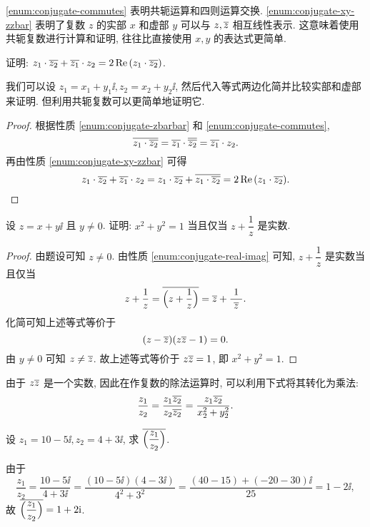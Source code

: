 \ref{enum:conjugate-commutes} 表明共轭运算和四则运算交换.
\ref{enum:conjugate-xy-zzbar} 表明了复数 $z$ 的实部 $x$ 和虚部 $y$ 可以与 $z,\overline z$ 相互线性表示.
这意味着使用共轭复数进行计算和证明, 往往比直接使用 $x,y$ 的表达式更简单.

\begin{example}
  证明: $z_1\cdot\overline{z_2}+\overline{z_1}\cdot z_2=2\operatorname{Re}{(z_1\cdot\overline{z_2})}$.
\end{example}

我们可以设 $z_1=x_1+y_1\ii,z_2=x_2+y_2\ii$, 然后代入等式两边化简并比较实部和虚部来证明.
但利用共轭复数可以更简单地证明它.

\begin{proof}
  根据性质 \ref{enum:conjugate-zbarbar} 和 \ref{enum:conjugate-commutes},
  \[
     \overline{z_1\cdot\overline{z_2}}
    =\overline{z_1}\cdot\overline{\overline{z_2}}
    =\overline{z_1}\cdot z_2.
  \]
  再由性质 \ref{enum:conjugate-xy-zzbar} 可得
  \[
     z_1\cdot\overline{z_2}+\overline{z_1}\cdot z_2
    =z_1\cdot\overline{z_2}+\overline{z_1\cdot\overline{z_2}}
    =2\operatorname{Re}{(z_1\cdot\overline{z_2})}.
  \]
\end{proof}

\begin{example}
  设 $z=x+y\ii$ 且 $y\neq 0$. 证明: $x^2+y^2=1$ 当且仅当 $z+\dfrac1z$ 是实数.
\end{example}
\begin{proof}
  由题设可知 $z\neq 0$.
  由性质 \ref{enum:conjugate-real-imag} 可知, 
  $z+\dfrac1z$ 是实数当且仅当
  \[
     z+\frac1z
    =\overline{\Bigl(z+\frac1z\Bigr)}
    =\overline z+\frac1{~\overline z~}.
  \]
  化简可知上述等式等价于
  \[
    (z-\overline z)(z\overline z-1)=0.
  \]
  由 $y\neq0$ 可知 $z\neq \overline z$.
  故上述等式等价于 $z\overline z=1$, 即 $x^2+y^2=1$.
\end{proof}

由于 $z\overline z$ 是一个实数,
因此在作复数的除法运算时, 可以利用下式将其转化为乘法:
\[
   \dfrac{z_1}{z_2}
  =\dfrac{z_1\overline{z_2}}{z_2\overline{z_2}}
  =\dfrac{z_1\overline{z_2}}{x_2^2+y_2^2}.
\]

\begin{example}
  设 $z_1=10-5\ii,z_2=4+3\ii$, 求 $\overline{\Bigl(\dfrac{z_1}{z_2}\Bigr)}$.
\end{example}

\begin{solution}
  由于
  \[
     \frac{z_1}{z_2}
    =\frac{10-5\ii}{4+3\ii}
    =\frac{(10-5\ii)(4-3\ii)}{4^2+3^2}
    =\frac{(40-15)+(-20-30)\ii}{25}
    =1-2\ii,
  \]
  故 $\overline{\Bigl(\dfrac{z_1}{z_2}\Bigr)}=1+2\mathrm{i}$.
\end{solution}

